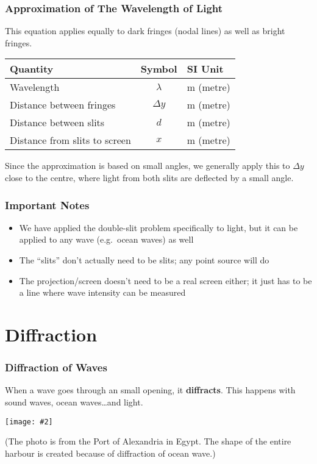 \documentclass[compress,aspectratio=169]{beamer}
\newcommand{\pic}[2]{\texttt{[image: \#2]}}
\newcommand{\eq}[2]{\vspace{#1}{\LARGE\begin{displaymath}#2\end{displaymath}}}
\begin{document}
\begin{frame}
  \frametitle{Approximation of The Wavelength of Light}
  This equation applies equally to dark fringes (nodal lines) as well as bright
  fringes.
  
  \eq{-.2in}{
    \boxed{\lambda\approx\frac{\Delta y d}{x}}
  }
  \begin{center}
    \begin{tabular}{l|c|l}
      \rowcolor{pink}
      \textbf{Quantity} & \textbf{Symbol} & \textbf{SI Unit} \\ \hline
      Wavelength                     & $\lambda$  & \si{\metre} (metre) \\
      Distance between fringes       & $\Delta y$ & \si{\metre} (metre) \\
      Distance between slits         & $d$        & \si{\metre} (metre) \\
      Distance from slits to screen & $x$        & \si{\metre} (metre) \\
    \end{tabular}
  \end{center}

  Since the approximation is based on small angles, we generally apply this
  to $\Delta y$ close to the centre, where light from both slits are deflected
  by a small angle.
\end{frame}


\begin{frame}
  \frametitle{Important Notes}
  \begin{itemize}
  \item We have applied the double-slit problem specifically to light, but it
    can be applied to any wave (e.g.\ ocean waves) as well
  \item The ``slits'' don't actually need to be slits; any point source will do
  \item The projection/screen doesn't need to be a real screen either; it just
    has to be a line where wave intensity can be measured
  \end{itemize}
\end{frame}

\section{Diffraction}

\begin{frame}
  \frametitle{Diffraction of Waves}
  When a wave goes through an small opening, it \textbf{diffracts}. This happens
  with sound waves, ocean waves\ldots and light.
  \begin{center}
    \pic{.6}{alexandria.jpg}
  \end{center}
  (The photo is from the Port of Alexandria in Egypt. The shape of the entire
  harbour is created because of diffraction of ocean wave.)
\end{frame}
\end{document}
